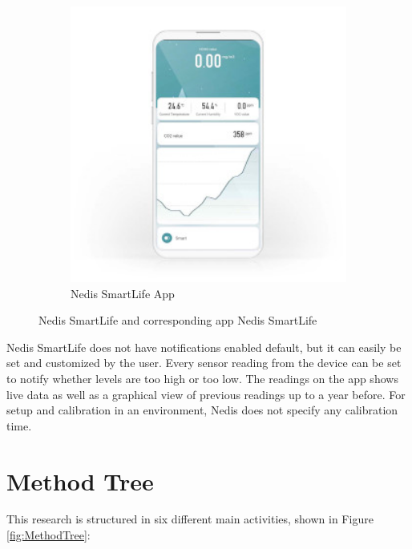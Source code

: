 \begin{figure} [H]
\begin{subfigure}{0.35\textwidth}
         \includegraphics[width=1.2\textwidth]{figures/NedisApp.jpg}
         \caption{Nedis SmartLife App \cite{Nedis}}
         \label{fig:NedisDev}
     \end{subfigure}
     \caption{Nedis SmartLife and corresponding app Nedis SmartLife}
     \label{fig:NedisBoth}
\end{figure}

Nedis SmartLife does not have notifications enabled default, but it can easily be set and customized by the user. Every sensor reading from the device can be set to notify whether levels are too high or too low. The readings on the app shows live data as well as a graphical view of previous readings up to a year before. For setup and calibration in an environment, Nedis does not specify any calibration time.  

\section{Method Tree}
This research is structured in six different main activities, shown in Figure \ref{fig:MethodTree}:

